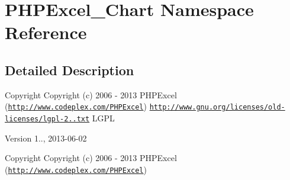 \hypertarget{namespacePHPExcel__Chart}{}\section{P\+H\+P\+Excel\+\_\+\+Chart Namespace Reference}
\label{namespacePHPExcel__Chart}


\subsection{Detailed Description}
\begin{DoxyCopyright}{Copyright}
Copyright (c) 2006 -\/ 2013 P\+H\+P\+Excel (\href{http://www.codeplex.com/PHPExcel}{\tt http\+://www.\+codeplex.\+com/\+P\+H\+P\+Excel})  \href{http://www.gnu.org/licenses/old-licenses/lgpl-2.1.txt}{\tt http\+://www.\+gnu.\+org/licenses/old-\/licenses/lgpl-\/2..\+txt} L\+G\+PL 
\end{DoxyCopyright}
\begin{DoxyVersion}{Version}
1.., 2013-\/06-\/02
\end{DoxyVersion}
\begin{DoxyCopyright}{Copyright}
Copyright (c) 2006 -\/ 2013 P\+H\+P\+Excel (\href{http://www.codeplex.com/PHPExcel}{\tt http\+://www.\+codeplex.\+com/\+P\+H\+P\+Excel}) 
\end{DoxyCopyright}
